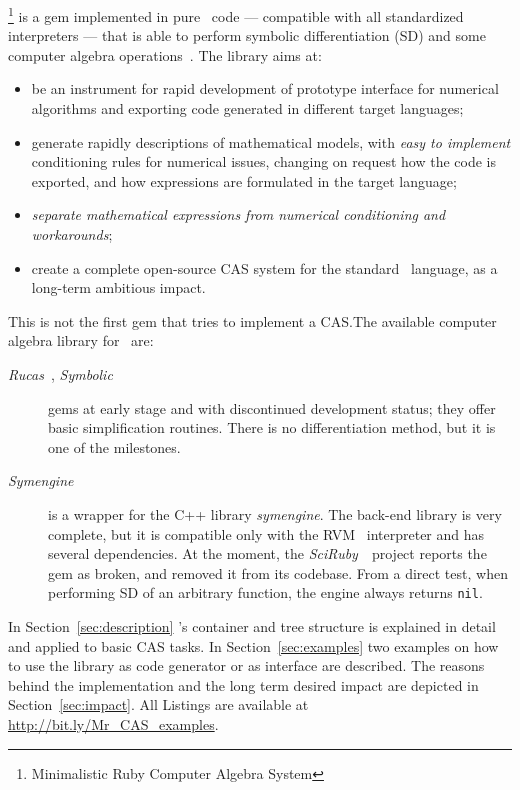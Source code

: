 \ragnicas\footnote{Minimalistic Ruby Computer Algebra System} is a gem implemented in pure \Ruby~code --- compatible with all standardized interpreters --- that is able to perform symbolic differentiation (SD) and some computer algebra operations~\cite{von2013modern}. The library aims at:
\begin{itemize}
  \item be an instrument for rapid development of prototype interface for numerical algorithms and exporting code generated in different target languages;
  \item generate rapidly descriptions of mathematical models, with \emph{easy to implement} conditioning rules for numerical issues, changing on request how the code is exported, and how expressions are formulated in the target language;
  \item \emph{separate mathematical expressions from numerical conditioning and workarounds};
  \item create a complete open-source CAS system for the standard \Ruby~language, as a long-term ambitious impact.
\end{itemize}

This is not the first gem that tries to implement a CAS.\@ The available computer algebra library for \Ruby~are:
\begin{description}
  \item [\emph{Rucas}~\cite{rucas}, \emph{Symbolic}~\cite{symbolic}] gems at early stage and with discontinued development status; they offer basic simplification routines. There is no differentiation method, but it is one of the milestones.
  \item [\emph{Symengine}~\cite{symengine}] is a wrapper for the C++ library \emph{symengine}. The back-end library is very complete, but it is compatible only with the RVM \Ruby~interpreter and has several dependencies. At the moment, the \emph{SciRuby}~\cite{sciruby}~project reports the gem as broken, and removed it from its codebase. From a direct test, when performing SD of an arbitrary function, the engine always returns \texttt{nil}.
\end{description}

In Section~\ref{sec:description} \ragnicas's container and tree structure is explained in detail and applied to basic CAS tasks. In Section~\ref{sec:examples} two examples on how to use the library as code generator or as interface are described. The reasons behind the implementation and the long term desired impact are depicted in Section~\ref{sec:impact}. All Listings are available at \url{http://bit.ly/Mr_CAS_examples}.
